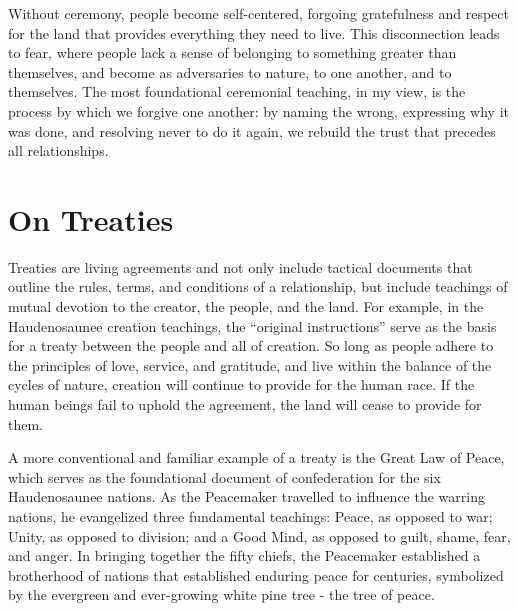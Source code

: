 \documentclass{report}
\begin{document}
\hspace{24pt} Without ceremony, people become self-centered, forgoing gratefulness and respect for the land that provides everything they need to live. This disconnection leads to fear, where people lack a sense of belonging to something greater than themselves, and become as adversaries to nature, to one another, and to themselves. The most foundational ceremonial teaching, in my view, is the process by which we forgive one another: by naming the wrong, expressing why it was done, and resolving never to do it again, we rebuild the trust that precedes all relationships.

\section{On Treaties}

\hspace{24pt} Treaties are living agreements and not only include tactical documents that outline the rules, terms, and conditions of a relationship, but include teachings of mutual devotion to the creator, the people, and the land. For example, in the Haudenosaunee creation teachings, the ``original instructions'' serve as the basis for a treaty between the people and all of creation. So long as people adhere to the principles of love, service, and gratitude, and live within the balance of the cycles of nature, creation will continue to provide for the human race. If the human beings fail to uphold the agreement, the land will cease to provide for them.


\hspace{24pt} A more conventional and familiar example of a treaty is the Great Law of Peace, which serves as the foundational document of confederation for the six Haudenosaunee nations. As the Peacemaker travelled to influence the warring nations, he evangelized three fundamental teachings: Peace, as opposed to war; Unity, as opposed to division; and a Good Mind, as opposed to guilt, shame, fear, and anger. In bringing together the fifty chiefs, the Peacemaker established a brotherhood of nations that established enduring peace for centuries, symbolized by the evergreen and ever-growing white pine tree - the tree of peace.
\end{document}
